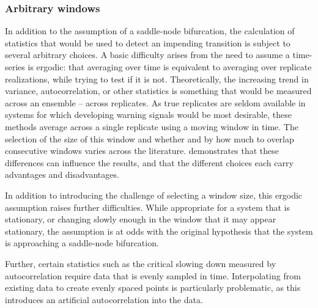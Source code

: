 \documentclass[authoryear,review,11pt]{elsarticle}
\begin{document}
\subsubsection*{Arbitrary windows}
In addition to the assumption of a saddle-node bifurcation, 
the calculation of statistics that would be used to detect an impending transition is subject to several arbitrary choices.
A basic difficulty arises from the need to assume a time-series is ergodic: 
that averaging over time is equivalent to averaging over replicate realizations,
while trying to test if it is not.
Theoretically, the increasing trend in variance, autocorrelation, or other statistics
is something that would be measured across an ensemble -- across replicates. %
As true replicates are seldom available in systems for which developing warning signals would be most desirable,
these methods average across a single replicate using a moving window in time.
The selection of the size of this window and whether and by how much to overlap consecutive windows
varies across the literature.
\citet{Lenton2012} demonstrates that these differences can influence the results,
and that the different choices each carry advantages and disadvantages.

In addition to introducing the challenge of selecting a window size,
this ergodic assumption raises further difficulties.
While appropriate for a system that is stationary,
or changing slowly enough in the window that it may appear stationary,
the assumption is at odds with the original hypothesis
that the system is approaching a saddle-node bifurcation.

Further, certain statistics such as the critical slowing down measured by autocorrelation
require data that is evenly sampled in time.
Interpolating from existing data to create evenly spaced points is particularly problematic,
as this introduces an artificial autocorrelation into the data.
\end{document}
